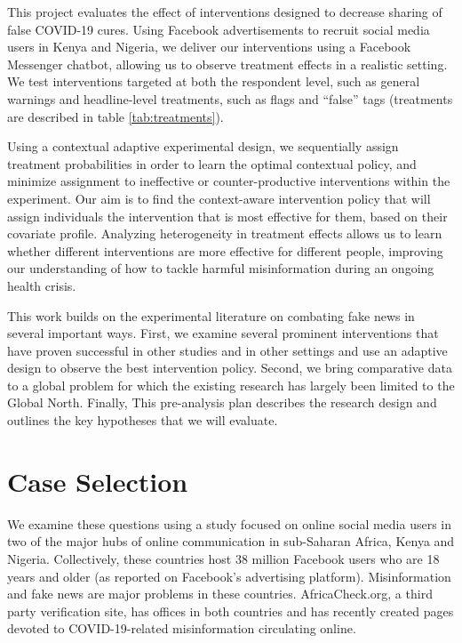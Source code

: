 \documentclass[letterpaper, 12pt, parskip=full, headsepline]{scrartcl}
\begin{document}
This project evaluates the effect of interventions designed to decrease sharing of false COVID-19 cures. Using Facebook advertisements to recruit social media users in Kenya and Nigeria, we deliver our interventions using a Facebook Messenger chatbot, allowing us to observe treatment effects in a realistic setting. We test interventions targeted at both the respondent level, such as general warnings and headline-level treatments, such as flags and ``false'' tags (treatments are described in table \ref{tab:treatments}). 

Using a contextual adaptive experimental design, we sequentially assign treatment probabilities in order to learn the optimal contextual policy, and minimize assignment to ineffective or counter-productive interventions within the experiment. Our aim is to find the context-aware intervention policy that will assign individuals the intervention that is most effective for them, based on their covariate profile. Analyzing heterogeneity in treatment effects allows us to learn whether different interventions are more effective for different people, improving our understanding of how to tackle harmful misinformation during an ongoing health crisis. 



This work builds on the experimental literature on combating fake news in several important ways. First, we examine several prominent interventions that have proven successful in other studies and in other settings and use an adaptive design to observe the best intervention policy. Second, we bring comparative data to a global problem for which the existing research has largely been limited to the Global North. Finally, This pre-analysis plan describes the research design and outlines the key hypotheses that we will evaluate.




\section{Case Selection}

We examine these questions using a study focused on online social media users in two of the major hubs of online communication in sub-Saharan Africa, Kenya and Nigeria. Collectively, these countries host 38 million Facebook users who are 18 years and older (as reported on Facebook's advertising platform). Misinformation and fake news are major problems in these countries. AfricaCheck.org, a third party verification site, has offices in both countries and has recently created pages devoted to COVID-19-related misinformation circulating online. 
\end{document}
